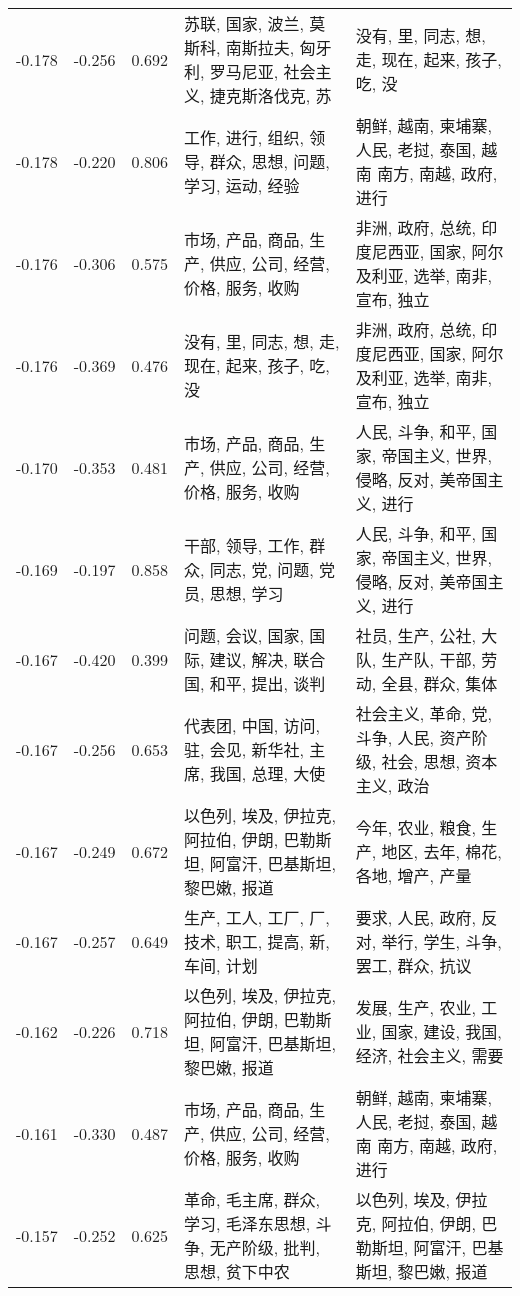 \begin{tabular}{cccp{5cm}p{5cm}}
-0.178 & -0.256 & 0.692 & 苏联, 国家, 波兰, 莫斯科, 南斯拉夫, 匈牙利, 罗马尼亚, 社会主义, 捷克斯洛伐克, 苏 & 没有, 里, 同志, 想, 走, 现在, 起来, 孩子, 吃, 没 \\
-0.178 & -0.220 & 0.806 & 工作, 进行, 组织, 领导, 群众, 思想, 问题, 学习, 运动, 经验 & 朝鲜, 越南, 柬埔寨, 人民, 老挝, 泰国, 越南 南方, 南越, 政府, 进行 \\
-0.176 & -0.306 & 0.575 & 市场, 产品, 商品, 生产, 供应, 公司, 经营, 价格, 服务, 收购 & 非洲, 政府, 总统, 印度尼西亚, 国家, 阿尔及利亚, 选举, 南非, 宣布, 独立 \\
-0.176 & -0.369 & 0.476 & 没有, 里, 同志, 想, 走, 现在, 起来, 孩子, 吃, 没 & 非洲, 政府, 总统, 印度尼西亚, 国家, 阿尔及利亚, 选举, 南非, 宣布, 独立 \\
-0.170 & -0.353 & 0.481 & 市场, 产品, 商品, 生产, 供应, 公司, 经营, 价格, 服务, 收购 & 人民, 斗争, 和平, 国家, 帝国主义, 世界, 侵略, 反对, 美帝国主义, 进行 \\
-0.169 & -0.197 & 0.858 & 干部, 领导, 工作, 群众, 同志, 党, 问题, 党员, 思想, 学习 & 人民, 斗争, 和平, 国家, 帝国主义, 世界, 侵略, 反对, 美帝国主义, 进行 \\
-0.167 & -0.420 & 0.399 & 问题, 会议, 国家, 国际, 建议, 解决, 联合国, 和平, 提出, 谈判 & 社员, 生产, 公社, 大队, 生产队, 干部, 劳动, 全县, 群众, 集体 \\
-0.167 & -0.256 & 0.653 & 代表团, 中国, 访问, 驻, 会见, 新华社, 主席, 我国, 总理, 大使 & 社会主义, 革命, 党, 斗争, 人民, 资产阶级, 社会, 思想, 资本主义, 政治 \\
-0.167 & -0.249 & 0.672 & 以色列, 埃及, 伊拉克, 阿拉伯, 伊朗, 巴勒斯坦, 阿富汗, 巴基斯坦, 黎巴嫩, 报道 & 今年, 农业, 粮食, 生产, 地区, 去年, 棉花, 各地, 增产, 产量 \\
-0.167 & -0.257 & 0.649 & 生产, 工人, 工厂, 厂, 技术, 职工, 提高, 新, 车间, 计划 & 要求, 人民, 政府, 反对, 举行, 学生, 斗争, 罢工, 群众, 抗议 \\
-0.162 & -0.226 & 0.718 & 以色列, 埃及, 伊拉克, 阿拉伯, 伊朗, 巴勒斯坦, 阿富汗, 巴基斯坦, 黎巴嫩, 报道 & 发展, 生产, 农业, 工业, 国家, 建设, 我国, 经济, 社会主义, 需要 \\
-0.161 & -0.330 & 0.487 & 市场, 产品, 商品, 生产, 供应, 公司, 经营, 价格, 服务, 收购 & 朝鲜, 越南, 柬埔寨, 人民, 老挝, 泰国, 越南 南方, 南越, 政府, 进行 \\
-0.157 & -0.252 & 0.625 & 革命, 毛主席, 群众, 学习, 毛泽东思想, 斗争, 无产阶级, 批判, 思想, 贫下中农 & 以色列, 埃及, 伊拉克, 阿拉伯, 伊朗, 巴勒斯坦, 阿富汗, 巴基斯坦, 黎巴嫩, 报道 \\

\end{tabular}
